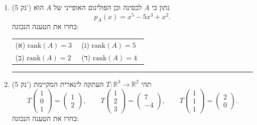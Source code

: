 \documentclass[12pt, a4paper]{article}
\newcommand{\points}[1]{(#1 נק') }
\begin{document}
\begin{enumerate}
\noindent\rule{\textwidth-30pt}{0.4pt}



\item\points{5}
 נתון כי $A$ לכסינה וכן הפולינום האופייני של   $A$ הוא
\[
p_A(x)=x^5-5x^3+x^2.
\]
בחרו את הטענה הנכונה:

\begin{tabular}{@{}p{0.48\linewidth} p{0.48\linewidth}@{}}
(א) $\mathrm{rank}(A)=3$ & (ג) $\mathrm{rank}(A)=5$\\
(ב) $\mathrm{rank}(A)=2$ & (ד) $\mathrm{rank}(A)=4$\\
\end{tabular}

\noindent\rule{\textwidth-30pt}{0.4pt}



\item\points{5}
תהי $T:\mathbb{R}^3\to\mathbb{R}^2$ העתקה לינארית המקיימת
\[
T\!\begin{pmatrix}1\\0\\1\end{pmatrix}=\begin{pmatrix}1\\2\end{pmatrix},
\qquad
T\!\begin{pmatrix}1\\2\\3\end{pmatrix}=\begin{pmatrix}7\\-4\end{pmatrix},
\qquad
T\!\begin{pmatrix}1\\1\\1\end{pmatrix}=\begin{pmatrix}2\\0\end{pmatrix}.
\]
בחרו את הטענה הנכונה:


\end{enumerate}
\end{document}
